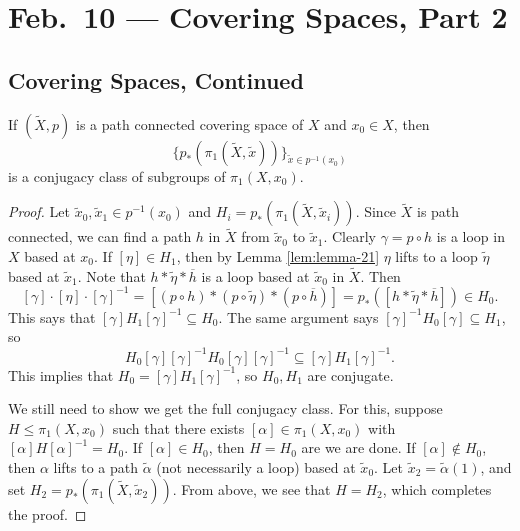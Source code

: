 \chapter{Feb.~10 --- Covering Spaces, Part 2}

\section{Covering Spaces, Continued}

\begin{lemma}
  If $(\widetilde{X}, p)$ is a path connected covering
  space of $X$ and $x_0 \in X$, then
  \[
    \{p_*(\pi_1(\widetilde{X}, \widetilde{x}))\}_{\widetilde{x} \in p^{-1}(x_0)}
  \]
  is a conjugacy class of subgroups of $\pi_1(X, x_0)$.
\end{lemma}

\begin{proof}
  Let $\widetilde{x}_0, \widetilde{x}_1 \in p^{-1}(x_0)$
  and $H_i = p_*(\pi_1(\widetilde{X}, \widetilde{x}_i))$.
  Since $\widetilde{X}$ is path connected, we can find a
  path $h$ in $\widetilde{X}$ from $\widetilde{x}_0$ to
  $\widetilde{x}_1$. Clearly $\gamma = p \circ h$ is a
  loop in $X$ based at $x_0$. If $[\eta] \in H_1$, then by
  Lemma \ref{lem:lemma-21} $\eta$ lifts to a loop
  $\widetilde{\eta}$ based at $\widetilde{x}_1$.
  Note that $h * \widetilde{\eta} * \overline{h}$ is a
  loop based at $\widetilde{x}_0$ in $\widetilde{X}$. Then
  \[
    [\gamma] \cdot [\eta] \cdot [\gamma]^{-1}
    = [(p \circ h) * (p \circ \widetilde{\eta}) * (p \circ \overline{h})]
    = p_*([h * \widetilde{\eta} * \overline{h}])
    \in H_0.
  \] 
  This says that $[\gamma] H_1 [\gamma]^{-1} \subseteq H_0$.
  The same argument says
  $[\gamma]^{-1} H_0 [\gamma] \subseteq H_1$, so
  \[
    H_0 [\gamma] [\gamma]^{-1} H_0 [\gamma] [\gamma]^{-1}
    \subseteq [\gamma] H_1 [\gamma]^{-1}.
  \]
  This implies that $H_0 = [\gamma] H_1 [\gamma]^{-1}$, so
  $H_0, H_1$ are conjugate.

  We still need to show we
  get the full conjugacy class.
  For this, suppose $H \le \pi_1(X, x_0)$ such that
  there exists $[\alpha] \in \pi_1(X, x_0)$ with
  $[\alpha] H [\alpha]^{-1} = H_0$. If $[\alpha] \in H_0$,
  then $H = H_0$ are we are done. If $[\alpha] \notin H_0$,
  then $\alpha$ lifts to a path $\widetilde{\alpha}$ (not
  necessarily a loop) based at $\widetilde{x}_0$.
  Let $\widetilde{x}_2 = \widetilde{\alpha}(1)$, and set
  $H_2 = p_*(\pi_1(\widetilde{X}, \widetilde{x}_2))$.
  From above, we see that $H = H_2$, which completes the
  proof.
\end{proof}


